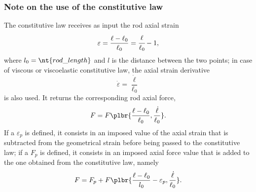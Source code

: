 \subsubsection{Note on the use of the constitutive law}
The constitutive law  receives as input the rod axial strain
\begin{equation}
	\varepsilon = \frac{\ell - \ell_0}{\ell_0} = \cfrac{\ell}{\ell_0} - 1 ,
\end{equation}
where $l_0=\nt{rod\_length}$ and $l$ is the distance between the two points;
in case of viscous or viscoelastic constitutive law, the axial strain derivative
\begin{equation}
	\dot{\varepsilon} = \frac{\dot{\ell}}{\ell_0}
\end{equation}
is also used.
It returns the corresponding rod axial force,
\begin{displaymath}
	F = F\plbr{\frac{\ell - \ell_0}{\ell_0}, \frac{\dot{\ell}}{\ell_0}} .
\end{displaymath}
If a  $\varepsilon_p$ is defined,
it consists in an imposed value of the axial strain
that is subtracted from the geometrical strain
before being passed to the constitutive law;
if a  $F_p$ is defined,
it consists in an imposed axial force value
that is added to the one obtained from the constitutive law,
namely
\begin{displaymath}
	F = F_p + F\plbr{\frac{\ell - \ell_0}{l_0} - \varepsilon_p, \frac{\dot{\ell}}{\ell_0}} .
\end{displaymath}

